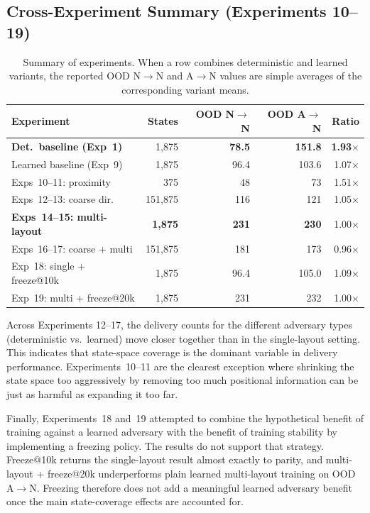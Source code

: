 \documentclass[sigconf]{aamas}
\begin{document}
\subsection{Cross-Experiment Summary (Experiments 10--19)}
\begin{table}[H]
\caption{Summary of experiments. When a row combines deterministic and learned variants, the reported OOD N$\to$N and A$\to$N values are simple averages of the corresponding variant means.}
\label{tab:cross-option}
\centering
\footnotesize
\begin{tabular}{lrrrr}
\toprule
\textbf{Experiment} & \textbf{States} & \textbf{OOD N$\to$N} & \textbf{OOD A$\to$N} & \textbf{Ratio} \\
\midrule
\textbf{Det.\ baseline (Exp~1)}    & 1,875   & \textbf{78.5}  & \textbf{151.8} & \textbf{1.93$\times$} \\
Learned baseline (Exp~9)           & 1,875   & 96.4           & 103.6           & 1.07$\times$ \\
Exps~10--11: proximity             & 375     & 48             & 73             & 1.51$\times$ \\
Exps~12--13: coarse dir.           & 151,875 & 116            & 121            & 1.05$\times$ \\
\textbf{Exps~14--15: multi-layout} & \textbf{1,875} & \textbf{231} & \textbf{230} & 1.00$\times$ \\
Exps~16--17: coarse + multi        & 151,875 & 181            & 173            & 0.96$\times$ \\
Exp~18: single + freeze@10k        & 1,875   & 96.4           & 105.0           & 1.09$\times$ \\
Exp~19: multi + freeze@20k         & 1,875   & 231            & 232            & 1.00$\times$ \\
\bottomrule
\end{tabular}
\end{table}

Across Experiments 12--17, the delivery counts for the different adversary types
(deterministic vs.\ learned) move closer together than in the single-layout setting. This indicates that state-space coverage is the dominant
variable in delivery performance. Experiments~10--11 are the clearest exception where
shrinking the state space too aggressively by removing too much positional
information can be just as harmful as expanding it too far. 

Finally, Experiments~18 and~19 attempted to combine the hypothetical benefit of
training against a learned adversary with the benefit of training stability by
implementing a freezing policy. The results do not support that
strategy. Freeze@10k returns the single-layout result almost exactly to parity, and
multi-layout + freeze@20k underperforms plain learned multi-layout training on
OOD A$\to$N. Freezing therefore does not add a meaningful learned adversary
benefit once the main state-coverage effects are accounted for.
\end{document}

